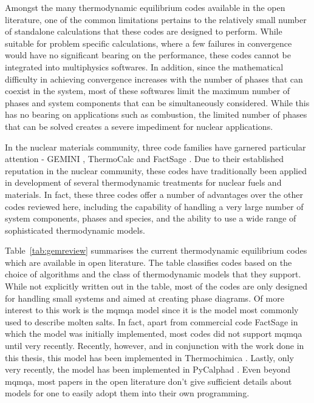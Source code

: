 	Amongst the many thermodynamic equilibrium codes available in the open literature, one of the common limitations pertains to the relatively small number of standalone calculations that these codes are designed to perform. While suitable for problem specific calculations, where a few failures in convergence would have no significant bearing on the performance, these codes cannot be integrated into multiphysics softwares. In addition, since the mathematical difficulty in achieving convergence increases with the number of phases that can coexist in the system, most of these softwares  limit the maximum number of phases and system components that can be simultaneously considered. While this has no bearing on applications such as combustion, the limited number of phases that can be solved creates a severe impediment for nuclear applications.

	In the nuclear materials community, three code families have garnered particular attention - GEMINI \cite{Cheynet09}, ThermoCalc \cite{ANDERSSON2002273} and FactSage \cite{Bale02}. Due to their established reputation in the nuclear community, these codes have traditionally been applied in development of several thermodynamic treatments for nuclear fuels and materials. In fact, these three codes offer a number of advantages over the other codes reviewed here, including the capability of handling a very large number of system components, phases and species, and the ability to use a wide range of sophisticated thermodynamic models.

    Table~\ref{tab:gemreview} summarises the current thermodynamic equilibrium codes which are available in open literature. The table classifies codes based on the choice of algorithms and the class of thermodynamic models that they support. While not explicitly written out in the table, most of the codes are only designed for handling small systems and aimed at creating phase diagrams. Of more interest to this work is the \gls{mqmqa} model since it is the model most commonly used to describe molten salts. In fact, apart from commercial code FactSage in which the model was initially implemented, most codes did not support \gls{mqmqa} until very recently. Recently, however, and in conjunction with the work done in this thesis, this model has been implemented in Thermochimica \cite{Poschmann:2021ab}. Lastly, only very recently, the model has been implemented in PyCalphad \cite{Palma:2022aa}. Even beyond \gls{mqmqa}, most papers in the open literature don’t give sufficient details about models for one to easily adopt them into their own programming.
	
